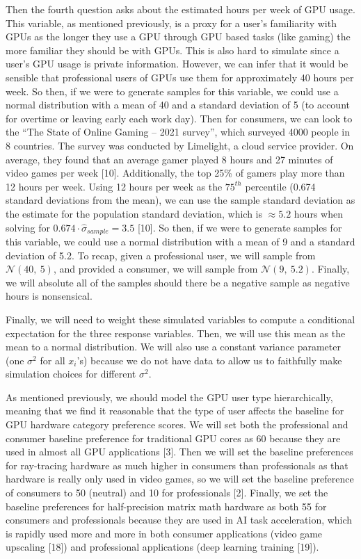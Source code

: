 \documentclass[
]{article}
\begin{document}
Then the fourth question asks about the estimated hours per week of GPU
usage. This variable, as mentioned previously, is a proxy for a user's
familiarity with GPUs as the longer they use a GPU through GPU based
tasks (like gaming) the more familiar they should be with GPUs. This is
also hard to simulate since a user's GPU usage is private information.
However, we can infer that it would be sensible that professional users
of GPUs use them for approximately 40 hours per week. So then, if we
were to generate samples for this variable, we could use a normal
distribution with a mean of 40 and a standard deviation of 5 (to account
for overtime or leaving early each work day). Then for consumers, we can
look to the ``The State of Online Gaming -- 2021 survey'', which
surveyed 4000 people in 8 countries. The survey was conducted by
Limelight, a cloud service provider. On average, they found that an
average gamer played 8 hours and 27 minutes of video games per week
{[}10{]}. Additionally, the top 25\% of gamers play more than 12 hours
per week. Using 12 hours per week as the \(75^{th}\) percentile (0.674
standard deviations from the mean), we can use the sample standard
deviation as the estimate for the population standard deviation, which
is \(\approx 5.2\) hours when solving for
\(0.674 \cdot \hat{\sigma}_{sample} = 3.5\) {[}10{]}. So then, if we
were to generate samples for this variable, we could use a normal
distribution with a mean of 9 and a standard deviation of 5.2. To recap,
given a professional user, we will sample from \(\mathcal{N}(40,~ 5)\),
and provided a consumer, we will sample from \(\mathcal{N}(9, ~5.2)\).
Finally, we will absolute all of the samples should there be a negative
sample as negative hours is nonsensical.

Finally, we will need to weight these simulated variables to compute a
conditional expectation for the three response variables. Then, we will
use this mean as the mean to a normal distribution. We will also use a
constant variance parameter (one \(\sigma^2\) for all \(x_i\)'s) because
we do not have data to allow us to faithfully make simulation choices
for different \(\sigma^2\).

As mentioned previously, we should model the GPU user type
hierarchically, meaning that we find it reasonable that the type of user
affects the baseline for GPU hardware category preference scores. We
will set both the professional and consumer baseline preference for
traditional GPU cores as 60 because they are used in almost all GPU
applications {[}3{]}. Then we will set the baseline preferences for
ray-tracing hardware as much higher in consumers than professionals as
that hardware is really only used in video games, so we will set the
baseline preference of consumers to 50 (neutral) and 10 for
professionals {[}2{]}. Finally, we set the baseline preferences for
half-precision matrix math hardware as both 55 for consumers and
professionals because they are used in AI task acceleration, which is
rapidly used more and more in both consumer applications (video game
upscaling {[}18{]}) and professional applications (deep learning
training {[}19{]}).
\end{document}
